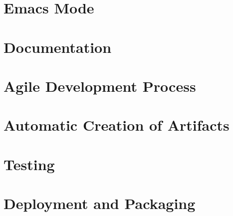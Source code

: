 \documentclass{article}
\begin{document}
\section{Emacs Mode}








\section{Documentation}










\section{Agile Development Process}



\section{Automatic Creation of Artifacts}



\section{Testing}



\section{Deployment and Packaging}


\end{document}
